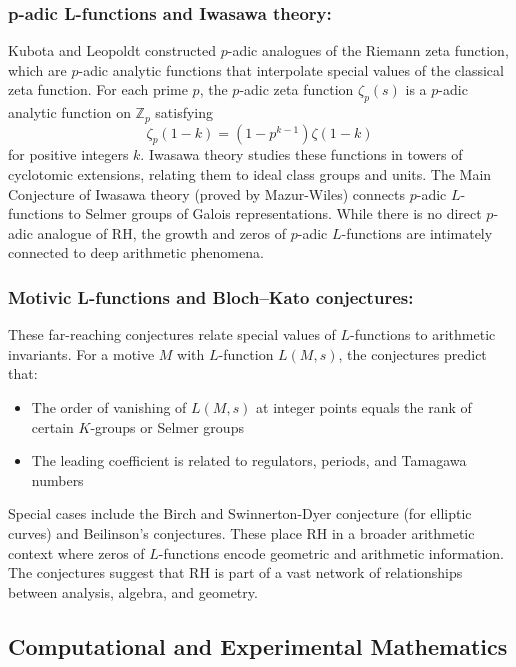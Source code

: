 \documentclass{article}
\begin{document}
\subsubsection{p-adic L-functions and Iwasawa theory:} Kubota and Leopoldt constructed $p$-adic analogues of the Riemann zeta function, which are $p$-adic analytic functions that interpolate special values of the classical zeta function. For each prime $p$, the $p$-adic zeta function $\zeta_p(s)$ is a $p$-adic analytic function on $\mathbb{Z}_p$ satisfying
    \[
    \zeta_p(1-k) = (1-p^{k-1})\zeta(1-k)
    \]
    for positive integers $k$. Iwasawa theory studies these functions in towers of cyclotomic extensions, relating them to ideal class groups and units. The Main Conjecture of Iwasawa theory (proved by Mazur-Wiles) connects $p$-adic $L$-functions to Selmer groups of Galois representations. While there is no direct $p$-adic analogue of RH, the growth and zeros of $p$-adic $L$-functions are intimately connected to deep arithmetic phenomena.

  \subsubsection{Motivic L-functions and Bloch–Kato conjectures:} These far-reaching conjectures relate special values of $L$-functions to arithmetic invariants. For a motive $M$ with $L$-function $L(M,s)$, the conjectures predict that:
    \begin{itemize}
        \item The order of vanishing of $L(M,s)$ at integer points equals the rank of certain $K$-groups or Selmer groups
        \item The leading coefficient is related to regulators, periods, and Tamagawa numbers
    \end{itemize}
    Special cases include the Birch and Swinnerton-Dyer conjecture (for elliptic curves) and Beilinson's conjectures. These place RH in a broader arithmetic context where zeros of $L$-functions encode geometric and arithmetic information. The conjectures suggest that RH is part of a vast network of relationships between analysis, algebra, and geometry.


\subsection{Computational and Experimental Mathematics}
\end{document}
